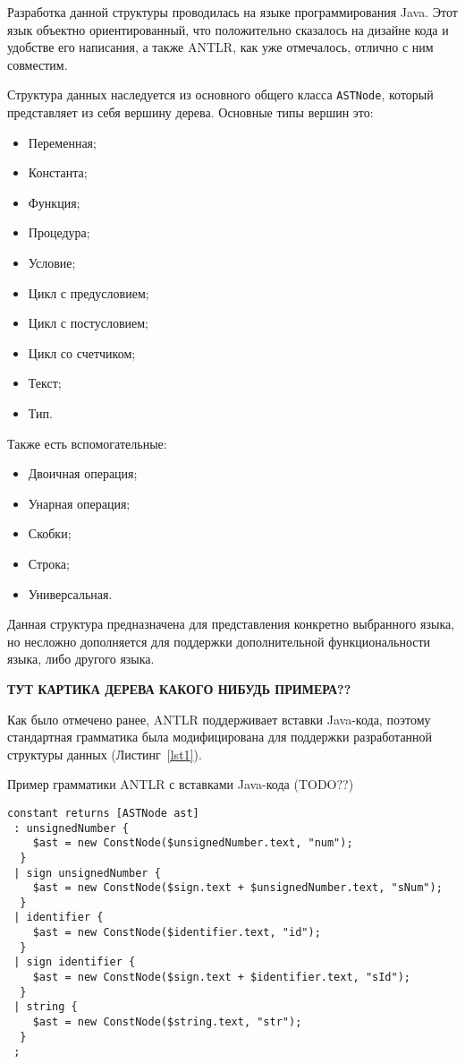 Разработка данной структуры проводилась на языке программирования Java. Этот язык объектно ориентированный, что положительно сказалось
на дизайне кода и удобстве его написания, а также ANTLR, как уже отмечалось, отлично с ним совместим.

Структура данных наследуется из основного общего класса \texttt{ASTNode}, который представляет из себя вершину дерева.
Основные типы вершин это:
\begin{itemize}
    \item Переменная;
    \item Константа;
    \item Функция;
    \item Процедура;
    \item Условие;
    \item Цикл с предусловием;
    \item Цикл с постусловием; 
    \item Цикл со счетчиком;
    \item Текст;
    \item Тип.
\end{itemize}
Также есть вспомогательные:
\begin{itemize}
    \item Двоичная операция;
    \item Унарная операция;
    \item Скобки;
    \item Строка;
    \item Универсальная.
\end{itemize}

Данная структура предназначена для представления конкретно выбранного языка, но несложно дополняется для поддержки дополнительной
функциональности языка, либо другого языка.

\textbf{ТУТ КАРТИКА ДЕРЕВА КАКОГО НИБУДЬ ПРИМЕРА??}

Как было отмечено ранее, ANTLR поддерживает вставки Java-кода, поэтому стандартная грамматика была модифицирована для поддержки
разработанной структуры данных (Листинг~\ref{lst1}). 

\begin{algorithm}[!h] 
\caption{Пример грамматики ANTLR с вставками Java-кода (TODO??)}\label{lst1} 
\begin{lstlisting} 
constant returns [ASTNode ast]
 : unsignedNumber {
    $ast = new ConstNode($unsignedNumber.text, "num");
  }
 | sign unsignedNumber {
    $ast = new ConstNode($sign.text + $unsignedNumber.text, "sNum");
  }
 | identifier {
    $ast = new ConstNode($identifier.text, "id");
  }
 | sign identifier {
    $ast = new ConstNode($sign.text + $identifier.text, "sId");
  }
 | string {
    $ast = new ConstNode($string.text, "str");
  }
 ; 
\end{lstlisting} 
\end{algorithm}

